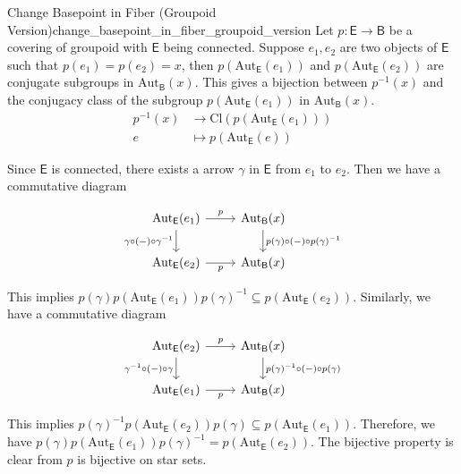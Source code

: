 \documentclass{report}
\begin{document}
\begin{proposition}{Change Basepoint in Fiber (Groupoid Version)}{change_basepoint_in_fiber_groupoid_version}
	Let $p:\mathsf{E}\to\mathsf{B}$ be a covering of groupoid with $\mathsf{E}$ being connected. Suppose $e_1,e_2$ are two objects of $\mathsf{E}$ such that $p(e_1)=p(e_2)=x$, then $p(\mathrm{Aut}_\mathsf{E}(e_1))$ and $p(\mathrm{Aut}_\mathsf{E}(e_2))$ are conjugate subgroups in $\mathrm{Aut}_{\mathsf{B}}(x)$. This gives a bijection between $p^{-1}(x)$ and the conjugacy class of the subgroup $p(\mathrm{Aut}_\mathsf{E}(e_1))$ in $\mathrm{Aut}_{\mathsf{B}}(x)$.
	\begin{align*}
		p^{-1}(x) &\longrightarrow \mathrm{Cl}(p(\mathrm{Aut}_\mathsf{E}(e_1)))\\
		e &\longmapsto p(\mathrm{Aut}_\mathsf{E}(e))
	\end{align*}
\end{proposition}

\begin{prf} 
	Since $\mathsf{E}$ is connected, there exists a arrow $\gamma$ in $\mathsf{E}$ from $e_1$ to $e_2$. Then we have a commutative diagram
	\begin{center}
		\[
		\begin{tikzcd}[ampersand replacement=\&]
			\mathrm{Aut}_\mathsf{E}(e_1) \arrow[r, "p"] \arrow[d, "\gamma\circ(-)\circ\gamma^{-1}"'] \& \mathrm{Aut}_\mathsf{B}(x) \arrow[d, "p(\gamma)\circ(-)\circ p(\gamma)^{-1}"] \\
			\mathrm{Aut}_\mathsf{E}(e_2) \arrow[r, "p"'] \& \mathrm{Aut}_\mathsf{B}(x) 
		\end{tikzcd}
		\]
	\end{center}
	This implies $ p(\gamma)p(\mathrm{Aut}_\mathsf{E}(e_1))p(\gamma)^{-1}\subseteq p(\mathrm{Aut}_\mathsf{E}(e_2))$.
	Similarly, we have a commutative diagram
	\begin{center}
		\[
		\begin{tikzcd}[ampersand replacement=\&]
			\mathrm{Aut}_\mathsf{E}(e_2) \arrow[r, "p"] \arrow[d, "\gamma^{-1}\circ(-)\circ\gamma"'] \& \mathrm{Aut}_\mathsf{B}(x) \arrow[d, "p(\gamma)^{-1}\circ(-)\circ p(\gamma)"] \\
			\mathrm{Aut}_\mathsf{E}(e_1) \arrow[r, "p"'] \& \mathrm{Aut}_\mathsf{B}(x) 
		\end{tikzcd}
		\]
	\end{center}
	This implies $ p(\gamma)^{-1}p(\mathrm{Aut}_\mathsf{E}(e_2))p(\gamma)\subseteq p(\mathrm{Aut}_\mathsf{E}(e_1))$. Therefore, we have  $ p(\gamma)p(\mathrm{Aut}_\mathsf{E}(e_1))p(\gamma)^{-1}= p(\mathrm{Aut}_\mathsf{E}(e_2))$. The bijective property is clear from $p$ is bijective on star sets.
\end{prf}
\end{document}
